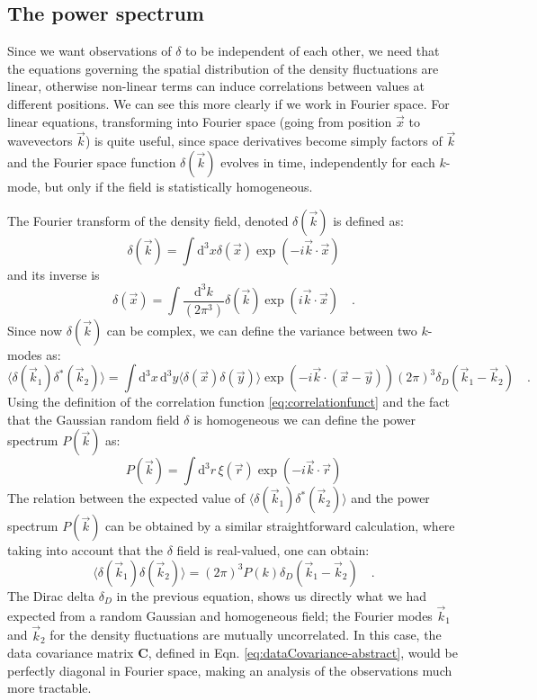 \subsection{The power spectrum}

Since we want observations of $\delta$ to be independent of each other, we need that the equations governing the spatial 
distribution of the density fluctuations are linear, otherwise non-linear terms can induce correlations between 
values at different positions. We can see this more clearly if we work in Fourier space.
For linear equations, transforming into Fourier space (going from position $\vec x$ to wavevectors $\vec k$) is quite useful, 
since space derivatives become simply factors of $\vec k$ and the Fourier space function $\delta(\vec k)$
evolves in time, independently for each $k$-mode, but only if the field is statistically homogeneous.

The Fourier transform of the density field, denoted $\delta(\vec k)$ is defined as:
\begin{equation}
\delta(\vec k) = \int \mathrm{d}^3 x \delta(\vec x) \exp(-i \vec{k} \cdot \vec{x})
\end{equation}
and its inverse is
\begin{equation}
\delta(\vec x) = \int \frac{\mathrm{d}^3 k}{(2\pi^3)} \delta(\vec k) \exp(i \vec{k} \cdot \vec{x}) \quad .
\end{equation}
Since now $\delta(\vec k)$ can be complex, we can define the variance between two $k$-modes as:
\begin{equation}
\langle \delta (\vec{k}_1)  \delta^{*} (\vec{k}_2) \rangle = 
\int \mathrm{d}^3 x \, \mathrm{d}^3 y \langle \delta (\vec{x})  \delta (\vec{y}) \rangle \exp(-i \vec{k} \cdot (\vec{x}-\vec{y}) )
(2\pi)^3 \delta_{D}(\vec{k}_{1}-\vec{k}_{2})  \quad .
\end{equation}
Using the definition of the correlation function \ref{eq:correlationfunct} and the fact that the Gaussian random field $\delta$
is homogeneous we can define the power spectrum $P(\vec k)$ as:
\begin{equation}\label{eq:powerspectrum}
P(\vec k) = \int \mathrm{d}^3r \, \xi(\vec r) \exp(-i \vec{k} \cdot \vec{r})
\end{equation}
The relation between the expected value of $\langle \delta (\vec{k}_1)  \delta^{*} (\vec{k}_2) \rangle$ and the power spectrum $P(\vec k)$ can be obtained by a similar straightforward calculation, \cite{(cite Luca, Dodelson, ??)} where taking into account
that the $\delta$ field is real-valued, one can obtain:
\begin{equation}
\langle \delta (\vec{k}_1)  \delta (\vec{k}_2) \rangle = (2\pi)^3  P(k) \delta_{D}(\vec{k}_{1}-\vec{k}_{2}) \quad .
\end{equation}
The Dirac delta $\delta_D$ in the previous equation, shows us directly what we had expected from a random Gaussian and homogeneous field;
the Fourier modes $\vec{k}_1$ and $\vec{k}_2$ for the density fluctuations are mutually uncorrelated.
In this case, the data covariance matrix $\mathbf{C}$, defined in Eqn. \ref{eq:dataCovariance-abstract},
would be perfectly diagonal in Fourier space, making an analysis of the observations much more tractable.

